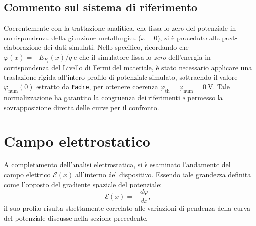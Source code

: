 \documentclass[a4paper,11pt]{report}
\begin{document}
\subsection{Commento sul sistema di riferimento}
Coerentemente con la trattazione analitica, che fissa lo zero del potenziale in corrispondenza della giunzione metallurgica ($x = 0$), si è proceduto alla post-elaborazione dei dati simulati. Nello specifico, ricordando che $\varphi(x) = -E_{F_i}(x)/q$ e che il simulatore fissa lo \textit{zero} dell'energia in corrispondenza del Livello di Fermi del materiale, è stato necessario applicare una traslazione rigida all'intero profilo di potenziale simulato, sottraendo il valore $\varphi_{\text{num}}(0)$ estratto da \texttt{Padre}, per ottenere coerenza $\varphi_{\text{th}} = \varphi_{\text{num}} = \SI{0}{\volt}$. Tale normalizzazione ha garantito la congruenza dei riferimenti e permesso la sovrapposizione diretta delle curve per il confronto.

\section{Campo elettrostatico}
A completamento dell'analisi elettrostatica, si è esaminato l'andamento del campo elettrico $\mathcal{E}(x)$ all'interno del dispositivo. Essendo tale grandezza definita come l'opposto del gradiente spaziale del potenziale:
\begin{equation}
    \mathcal{E}(x) = -\frac{d\varphi}{dx},
    \label{eq:profilo_E}
\end{equation}
il suo profilo risulta strettamente correlato alle variazioni di pendenza della curva del potenziale discusse nella sezione precedente.
\end{document}
